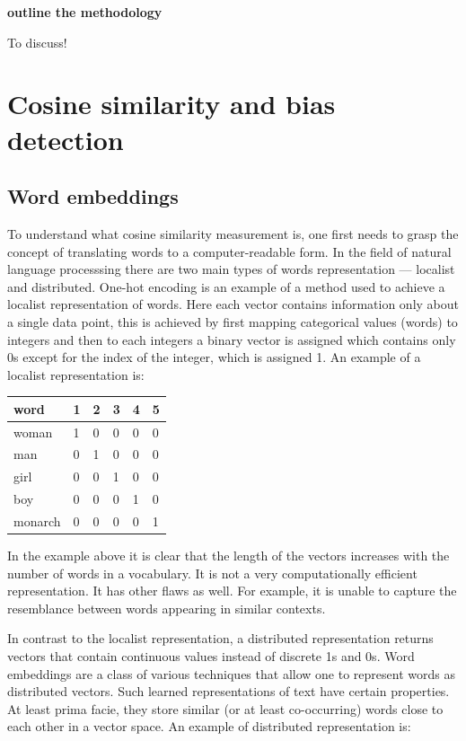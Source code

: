 \documentclass[12pt,]{book}
\begin{document}
\textbf{outline the methodology}

To discuss!

\chapter{Cosine similarity and bias
detection}\label{cosine-similarity-and-bias-detection}

\section{Word embeddings}\label{word-embeddings}

To understand what cosine similarity measurement is, one first needs to
grasp the concept of translating words to a computer-readable form. In
the field of natural language processsing there are two main types of
words representation --- localist and distributed. One-hot encoding is
an example of a method used to achieve a localist representation of
words. Here each vector contains information only about a single data
point, this is achieved by first mapping categorical values (words) to
integers and then to each integers a binary vector is assigned which
contains only 0s except for the index of the integer, which is assigned
1. An example of a localist representation is:

\begin{longtable}[]{@{}llllll@{}}
\toprule
word & 1 & 2 & 3 & 4 & 5\tabularnewline
\midrule
\endhead
woman & 1 & 0 & 0 & 0 & 0\tabularnewline
man & 0 & 1 & 0 & 0 & 0\tabularnewline
girl & 0 & 0 & 1 & 0 & 0\tabularnewline
boy & 0 & 0 & 0 & 1 & 0\tabularnewline
monarch & 0 & 0 & 0 & 0 & 1\tabularnewline
\bottomrule
\end{longtable}

In the example above it is clear that the length of the vectors
increases with the number of words in a vocabulary. It is not a very
computationally efficient representation. It has other flaws as well.
For example, it is unable to capture the resemblance between words
appearing in similar contexts.

In contrast to the localist representation, a distributed representation
returns vectors that contain continuous values instead of discrete 1s
and 0s. Word embeddings are a class of various techniques that allow one
to represent words as distributed vectors. Such learned representations
of text have certain properties. At least prima facie, they store
similar (or at least co-occurring) words close to each other in a vector
space. An example of distributed representation is:
\end{document}
